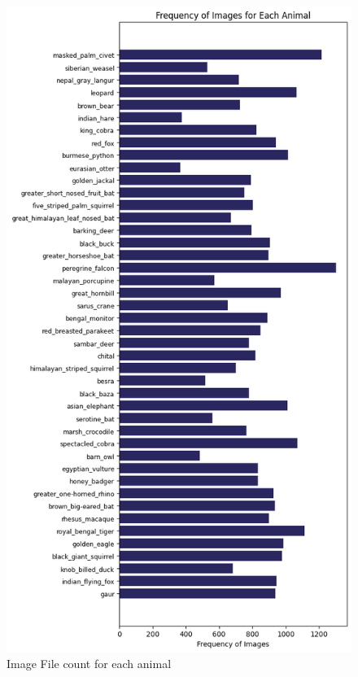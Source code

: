 \documentclass[fleqn, 10pt, twoside]{IOEGC}
\begin{document}
	{

		\begin{figure}
			\centering
			\includegraphics[scale=0.5]{Graphics/naturalist_horizontal.png}
			\caption{Image File count for each animal}
			\label{image_file_count_animal}
		\end{figure}

	}
\end{document}
